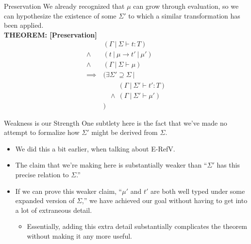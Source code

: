\documentclass[11pt]{beamer}
\begin{document}
\begin{frame}[fragile=singleslide]{Preservation}
We already recognized that $\mu$ can grow through evaluation, so we can hypothesize the existence of some $\Sigma'$ to which a similar transformation has been applied. \\ 
\vspace{1em}
\textbf{THEOREM: [Preservation]} \\
\begin{align*}
& \:(\Gamma \:|\:\Sigma \vdash t : T) \\
\land & \:(t\:|\:\mu \rightarrow t'\:|\:\mu') \\
\land & \:(\Gamma \:|\:\Sigma \vdash \mu) \\
\implies & \:(\exists \Sigma' \supseteq \Sigma \:|\: \\
& \:\:\:\:\:\:\:\:\:\:\:(\Gamma\:|\:\Sigma' \vdash t' : T) \\
& \:\:\:\:\:\land\:(\Gamma\:|\:\Sigma' \vdash \mu') \\
& \:)  
\end{align*}
\end{frame}


\begin{frame}[fragile=singleslide]{Weakness is our Strength}
One subtlety here is the fact that we've made no attempt to formalize how $\Sigma'$ might be derived from $\Sigma$. 
\begin{itemize}
\item We did this a bit earlier, when talking about E-RefV.  
\item The claim that we're making here is substantially weaker than ``$\Sigma'$ has this precise relation to $\Sigma$.''
\item If we can prove this weaker claim, ``$\mu'$ and $t'$ are both well typed under some expanded version of $\Sigma$,'' we have achieved our goal without having to get into a lot of extraneous detail.  
\begin{itemize}
\item Essentially, adding this extra detail substantially complicates the theorem without making it any more useful.  
\end{itemize}
\end{itemize}
\end{frame}
\end{document}
